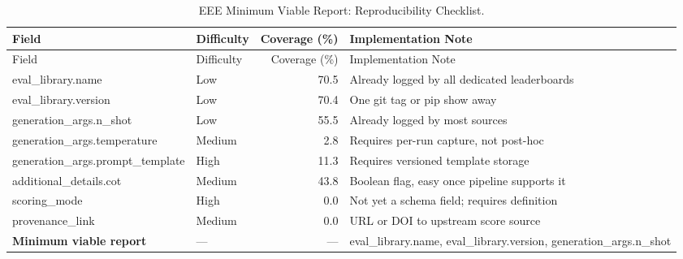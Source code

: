 \begin{longtable}{llrl}
\caption{EEE Minimum Viable Report: Reproducibility Checklist.}
\label{tab:reproducibility_checklist} \\
\toprule
Field & Difficulty & Coverage (\%) & Implementation Note \\
\midrule
\endfirsthead
\toprule
Field & Difficulty & Coverage (\%) & Implementation Note \\
\midrule
\endhead
eval\_library.name & Low & 70.5 & Already logged by all dedicated leaderboards \\
eval\_library.version & Low & 70.4 & One git tag or pip show away \\
generation\_args.n\_shot & Low & 55.5 & Already logged by most sources \\
generation\_args.temperature & Medium & 2.8 & Requires per-run capture, not post-hoc \\
generation\_args.prompt\_template & High & 11.3 & Requires versioned template storage \\
additional\_details.cot & Medium & 43.8 & Boolean flag, easy once pipeline supports it \\
scoring\_mode & High & 0.0 & Not yet a schema field; requires definition \\
provenance\_link & Medium & 0.0 & URL or DOI to upstream score source \\
\midrule
\textbf{Minimum viable report} & — & — & eval\_library.name, eval\_library.version, generation\_args.n\_shot \\
\bottomrule
\end{longtable}